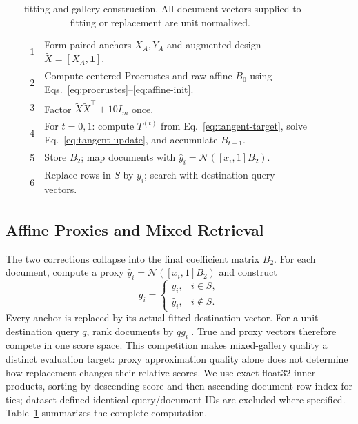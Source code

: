 \begin{table}[t]
\caption{\method\ fitting and gallery construction. All document vectors supplied
to fitting or replacement are unit normalized.}
\label{tab:algorithm}
\centering
\begin{minipage}{0.97\linewidth}
\small
\begin{tabular}{@{}r p{0.89\linewidth}@{}}
\toprule
1 & Form paired anchors $X_A,Y_A$ and augmented design
    $\widetilde{X}=[X_A,\mathbf{1}]$.\\
2 & Compute centered Procrustes and raw affine $B_0$
    using Eqs.~\eqref{eq:procrustes}--\eqref{eq:affine-init}.\\
3 & Factor $\widetilde{X}\widetilde{X}^{\top}+10I_m$ once.\\
4 & For $t=0,1$: compute $T^{(t)}$ from Eq.~\eqref{eq:tangent-target},
    solve Eq.~\eqref{eq:tangent-update}, and accumulate $B_{t+1}$.\\
5 & Store $B_2$; map documents with
    $\widehat{y}_i=\mathcal{N}([x_i,1]B_2)$.\\
6 & Replace rows in $S$ by $y_i$; search with destination query vectors.\\
\bottomrule
\end{tabular}
\end{minipage}
\end{table}

\subsection{Affine Proxies and Mixed Retrieval}
\label{sec:mixed-gallery}

The two corrections collapse into the final coefficient matrix $B_2$.
For each document, compute a proxy
$\widehat{y}_i=\mathcal{N}([x_i,1]B_2)$ and construct
\begin{equation}
 g_i=\begin{cases}
 y_i,&i\in S,\\
 \widehat{y}_i,&i\notin S.
 \end{cases}
 \label{eq:mixed-gallery}
\end{equation}
Every anchor is replaced by its actual fitted destination vector. For a unit
destination query $q$, rank documents by $qg_i^\top$. True and proxy vectors
therefore compete in one score space. This competition makes mixed-gallery
quality a distinct evaluation target: proxy approximation quality alone does
not determine how replacement changes their relative scores. We use exact
float32 inner products, sorting by descending score and then ascending document
row index for ties; dataset-defined identical query/document IDs are excluded
where specified. Table~\ref{tab:algorithm} summarizes the complete computation.

